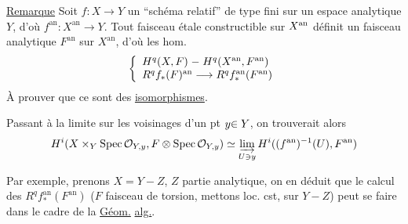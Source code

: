 
\uline{Remarque} Soit $f:X\longrightarrow Y$ un ``schéma relatif'' de type fini sur un espace analytique $Y$, d'où $f^{\mathrm{an}}:X^{\mathrm{an}}\longrightarrow Y$. Tout faisceau étale constructible  sur $X^{{{\mathrm{an}}}}$ définit un faisceau analytique $F^{\mathrm{an}}$ sur $X^{\mathrm{an}}$, d'où les hom.
\[
\left\{\begin{array}{l}
H^q(X,F)\;{-}\;H^q(X^{\mathrm{an}},F^{\mathrm{an}})\\
R^q f_*(F)^{\mathrm{an}}\longrightarrow R^q f^{\mathrm{an}}_*(F^{\mathrm{an}})
\end{array}\right.
\]
À prouver que ce sont des \uline{isomorphismes}.


\uline{} Passant à la limite sur les voisinages d'un pt $y{\in Y}$, on trouverait alors
\[
H^i(X\times_Y\operatorname{Spec}\mathcal O_{Y,y},
 F\otimes\operatorname{Spec}\mathcal O_{Y,y})
\simeq\varinjlim_{U\ni y}H^i((f^{\mathrm{an}})^{-1}(U),F^{\mathrm{an}})
\]
\margin{$*$}

Par exemple, prenons $X=Y-Z$, $Z$ partie analytique, on en déduit que le calcul des $R^q f_*^{\mathrm{an}}(F^{\mathrm{an}})$ ($F$ faisceau de torsion, mettons loc. cst, sur $Y-Z$)  peut se faire dans le cadre de la \uline{Géom.} \uline{alg.}.
